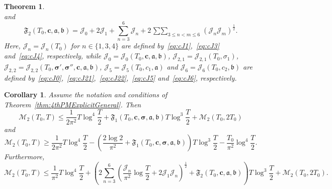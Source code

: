 \documentclass[a4paper,reqno]{amsart}
\newtheorem{theorem}{Theorem}
\newtheorem{corollary}{Corollary}
\theoremstyle{definition}
\begin{document}
\begin{theorem}
\[\]
and
\[
\mathfrak{F}_{2}\left(T_0,\bm{c},\bm{\mathfrak{a}},\bm{\mathfrak{b}}\right) = \mathcal{J}_0 + 2\mathcal{J}_{1} + \sum_{n=3}^{6}\mathcal{J}_{n} + 2\mathop{\sum\sum}_{3\leq n<m\leq 6}\left(\mathcal{J}_{n}\mathcal{J}_m\right)^{\frac{1}{2}}.
\]
Here, $\mathcal{J}_{n}=\mathcal{J}_{n}(T_0)$ for $n\in\{1,3,4\}$ are defined by~\eqref{eq:cJ1},~\eqref{eq:cJ3} and~\eqref{eq:cJ4}, respectively, while $\mathcal{J}_{0}=\mathcal{J}_0\left(T_0,\bm{c},\bm{\mathfrak{a}},\bm{\mathfrak{b}}\right)$, $\mathcal{J}_{2,1}=\mathcal{J}_{2,1}(T_0,\sigma_1)$, $\mathcal{J}_{2,2}=\mathcal{J}_{2,2}\left(T_0,\bm{\sigma'},\bm{\sigma''},\bm{c},\bm{\mathfrak{a}},\bm{\mathfrak{b}}\right)$, $\mathcal{J}_5=\mathcal{J}_5\left(T_0,c_1,\bm{\mathfrak{a}}\right)$ and $\mathcal{J}_6=\mathcal{J}_6\left(T_0,c_2,\bm{\mathfrak{b}}\right)$ are defined by~\eqref{eq:cJ0},~\eqref{eq:cJ21},~\eqref{eq:cJ22},~\eqref{eq:cJ5} and~\eqref{eq:cJ6}, respectively.
\end{theorem}

\begin{corollary}
\label{cor:4thPMExplicitGeneral}
Assume the notation and conditions of Theorem~\ref{thm:4thPMExplicitGeneral}. Then
\begin{equation}
\label{4thMlargeV}
\mathcal{M}_{2}(T_0,T) \leq \frac{1}{2\pi^2}T\log^{4}{\frac{T}{2}} + \mathfrak{F}_{1}\left(T_0,\bm{c},\bm{\sigma},\bm{\mathfrak{a}},\bm{\mathfrak{b}}\right)T\log^{3}{\frac{T}{2}} + \mathcal{M}_{2}(T_0,2T_0)
\end{equation}
and
\begin{equation}
\label{eq:4thMLower}
\mathcal{M}_{2}(T_0,T) \geq \frac{1}{2\pi^2}T\log^{4}{\frac{T}{2}} - \left(\frac{2\log{2}}{\pi^2}+\mathfrak{F}_{1}\left(T_0,\bm{c},\bm{\sigma},\bm{\mathfrak{a}},\bm{\mathfrak{b}}\right)\right)T\log^{3}{\frac{T}{2}} - \frac{T_0}{\pi^2}\log^{4}{\frac{T}{2}}.
\end{equation}
Furthermore,
\begin{equation}
\label{4thMsmallV}
\mathcal{M}_{2}(T_0,T) \leq \frac{1}{\pi^2}T\log^{4}{\frac{T}{2}} + \left(2\sum_{n=3}^{6}\left(\frac{\mathcal{J}_{n}}{\pi^2}\log{\frac{T}{2}}+2\mathcal{J}_{1}\mathcal{J}_{n}\right)^{\frac{1}{2}} + \mathfrak{F}_{2}\left(T_0,\bm{c},\bm{\mathfrak{a}},\bm{\mathfrak{b}}\right)\right)T\log^{3}{\frac{T}{2}} + \mathcal{M}_{2}(T_0,2T_0).
\end{equation}
\end{corollary}
\end{document}

